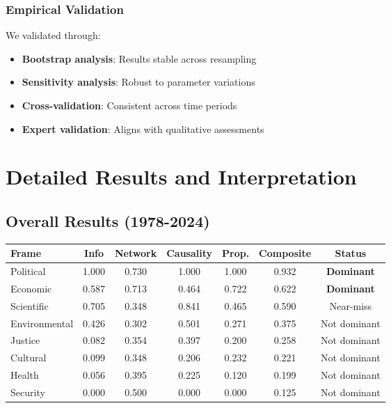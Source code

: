 \documentclass[11pt]{article}
\begin{document}
\subsubsection{Empirical Validation}

We validated through:
\begin{itemize}
    \item \textbf{Bootstrap analysis}: Results stable across resampling
    \item \textbf{Sensitivity analysis}: Robust to parameter variations
    \item \textbf{Cross-validation}: Consistent across time periods
    \item \textbf{Expert validation}: Aligns with qualitative assessments
\end{itemize}

\section{Detailed Results and Interpretation}

\subsection{Overall Results (1978-2024)}

\begin{table}[H]
\centering
\begin{tabular}{lcccccc}
\toprule
\textbf{Frame} & \textbf{Info} & \textbf{Network} & \textbf{Causality} & \textbf{Prop.} & \textbf{Composite} & \textbf{Status} \\
\midrule
Political & 1.000 & 0.730 & 1.000 & 1.000 & 0.932 & \textbf{Dominant} \\
Economic & 0.587 & 0.713 & 0.464 & 0.722 & 0.622 & \textbf{Dominant} \\
Scientific & 0.705 & 0.348 & 0.841 & 0.465 & 0.590 & Near-miss \\
Environmental & 0.426 & 0.302 & 0.501 & 0.271 & 0.375 & Not dominant \\
Justice & 0.082 & 0.354 & 0.397 & 0.200 & 0.258 & Not dominant \\
Cultural & 0.099 & 0.348 & 0.206 & 0.232 & 0.221 & Not dominant \\
Health & 0.056 & 0.395 & 0.225 & 0.120 & 0.199 & Not dominant \\
Security & 0.000 & 0.500 & 0.000 & 0.000 & 0.125 & Not dominant \\
\bottomrule
\end{tabular}
\end{table}
\end{document}
